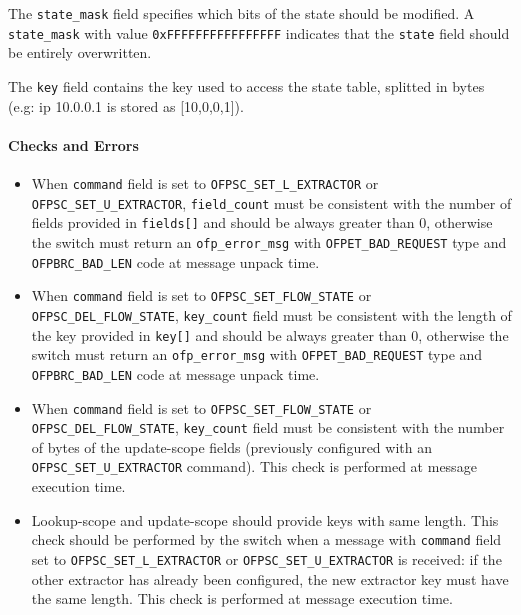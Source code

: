 The \texttt{state\_mask} field specifies which bits of the state should be modified. A \texttt{state\_mask} with value \texttt{0xFFFFFFFFFFFFFFFF} indicates that the \texttt{state} field should be entirely overwritten.

The \texttt{key} field contains the key used to access the state table, splitted in bytes (e.g: ip 10.0.0.1 is stored as [10,0,0,1]).

\paragraph{Checks and Errors}

\begin{itemize}
    \item When \texttt{command} field is set to \texttt{OFPSC\_SET\_L\_EXTRACTOR} or \texttt{OFPSC\_SET\_U\_EXTRACTOR}, \texttt{field\_count} must be consistent with the number of fields provided in \texttt{fields[]} and should be always greater than 0, otherwise the switch must return an \texttt{ofp\_error\_msg} with \texttt{OFPET\_BAD\_REQUEST} type and \texttt{OFPBRC\_BAD\_LEN} code at message unpack time.

    \item When \texttt{command} field is set to \texttt{OFPSC\_SET\_FLOW\_STATE} or \texttt{OFPSC\_DEL\_FLOW\_STATE}, \texttt{key\_count} field must be consistent with the length of the key provided in \texttt{key[]} and should be always greater than 0, otherwise the switch must return an \texttt{ofp\_error\_msg} with \texttt{OFPET\_BAD\_REQUEST} type and \texttt{OFPBRC\_BAD\_LEN} code at message unpack time.

    \item When \texttt{command} field is set to \texttt{OFPSC\_SET\_FLOW\_STATE} or \texttt{OFPSC\_DEL\_FLOW\_STATE}, \texttt{key\_count} field must be consistent with the number of bytes of the update-scope fields (previously configured with an \texttt{OFPSC\_SET\_U\_EXTRACTOR} command). This check is performed at message execution time.

    \item Lookup-scope and update-scope should provide keys with same length. This check should be performed by the switch when a message with \texttt{command} field set to \texttt{OFPSC\_SET\_L\_EXTRACTOR} or \texttt{OFPSC\_SET\_U\_EXTRACTOR} is received: if the other extractor has already been configured, the new extractor key must have the same length. This check is performed at message execution time.


\end{itemize}
